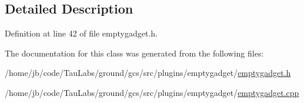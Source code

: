 \subsection{\-Detailed \-Description}


\-Definition at line 42 of file emptygadget.\-h.



\-The documentation for this class was generated from the following files\-:\begin{DoxyCompactItemize}
\item 
/home/jb/code/\-Tau\-Labs/ground/gcs/src/plugins/emptygadget/\hyperlink{emptygadget_8h}{emptygadget.\-h}\item 
/home/jb/code/\-Tau\-Labs/ground/gcs/src/plugins/emptygadget/\hyperlink{emptygadget_8cpp}{emptygadget.\-cpp}\end{DoxyCompactItemize}
